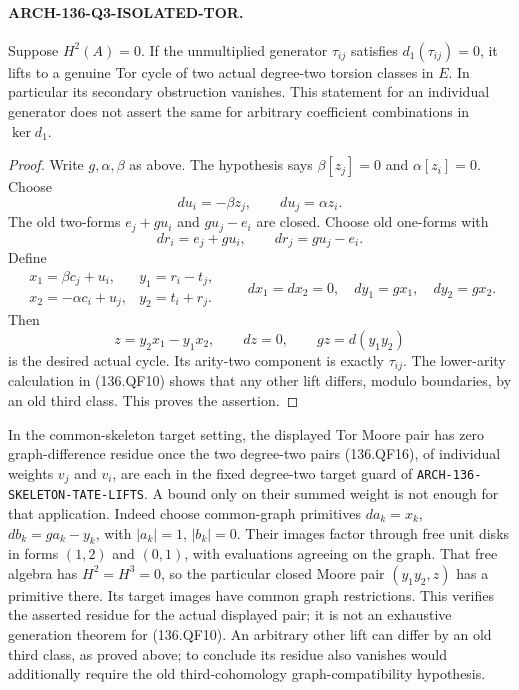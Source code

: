 \paragraph{ARCH-136-Q3-ISOLATED-TOR.}
Suppose \(H^2(A)=0\).  If the unmultiplied generator
\(\tau_{ij}\) satisfies \(d_1(\tau_{ij})=0\), it lifts
to a genuine Tor cycle of two actual degree-two torsion classes
in \(E\).  In particular its secondary obstruction vanishes.
This statement for an individual generator does not assert the
same for arbitrary coefficient combinations in \(\ker d_1\).

\begin{proof}
Write \(g,\alpha,\beta\) as above.  The hypothesis says
\(\beta[z_j]=0\) and \(\alpha[z_i]=0\).  Choose
\[
 du_i=-\beta z_j,\qquad du_j=\alpha z_i.
\]
The old two-forms \(e_j+g u_i\) and \(g u_j-e_i\)
are closed.  Choose old one-forms with
\[
                dr_i=e_j+g u_i,\qquad dr_j=g u_j-e_i.
\]
Define
\[
 \begin{array}{ll}
 x_1=\beta c_j+u_i,&y_1=r_i-t_j,\\
 x_2=-\alpha c_i+u_j,&y_2=t_i+r_j.
 \end{array}
 \qquad dx_1=dx_2=0,\quad dy_1=gx_1,\quad dy_2=gx_2.
                                                               \tag{136.QF16}
\]
Then
\[
             z=y_2x_1-y_1x_2,
                    \qquad dz=0,\qquad gz=d(y_1y_2)
                                                               \tag{136.QF17}
\]
is the desired actual cycle.  Its arity-two component is exactly
\(\tau_{ij}\).  The lower-arity calculation in (136.QF10)
shows that any other lift differs, modulo boundaries, by an old
third class.  This proves the assertion.
\end{proof}

In the common-skeleton target setting, the displayed Tor Moore
pair has zero graph-difference residue once the two degree-two
pairs (136.QF16), of individual weights \(v_j\) and \(v_i\),
are each in the fixed degree-two target guard of
\nolinkurl{ARCH-136-SKELETON-TATE-LIFTS}.  A bound only on
their summed weight is not enough for that application.  Indeed choose
common-graph primitives \(da_k=x_k\),
\(db_k=g a_k-y_k\), with \(|a_k|=1\), \(|b_k|=0\).
Their images factor through free unit disks in forms \((1,2)\)
and \((0,1)\), with evaluations agreeing on the graph.
That free algebra has \(H^2=H^3=0\), so the particular
closed Moore pair \((y_1y_2,z)\) has a primitive there.
Its target images have common graph restrictions.  This verifies
the asserted residue for the actual displayed pair; it is not
an exhaustive generation theorem for (136.QF10).  An arbitrary
other lift can differ by an old third class, as proved above;
to conclude its residue also vanishes would additionally require
the old third-cohomology graph-compatibility hypothesis.

